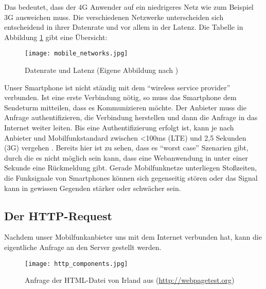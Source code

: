 			Das bedeutet, dass der 4G Anwender auf ein niedrigeres Netz wie zum Beispiel 3G ausweichen muss. Die verschiedenen Netzwerke unterscheiden sich entscheidend in ihrer Datenrate und vor allem in der Latenz. Die Tabelle in Abbildung \ref{fig:mobile_networks} gibt eine Übersicht:

			\begin{figure}[htbp]
				\begin{center}
					\texttt{[image: mobile\_networks.jpg]}
					\caption{Datenrate und Latenz (Eigene Abbildung nach \autocite{grigorikGNetwork})}
					\label{fig:mobile_networks}
				\end{center}
			\end{figure}

			Unser Smartphone ist nicht ständig mit dem "`wireless service provider"' verbunden. Ist eine erste Verbindung nötig, so muss das Smartphone dem Sendeturm mitteilen, dass es Kommunizieren möchte. Der Anbieter muss die Anfrage authentifizieren, die Verbindung herstellen und dann die Anfrage in das Internet weiter leiten. Bis eine Authentifizierung erfolgt ist, kann je nach Anbieter und Mobilfunkstandard zwischen <100ms (LTE) und 2,5 Sekunden (3G) vergehen \autocite{grigorikRadio}. Bereits hier ist zu sehen, dass es "`worst case"' Szenarien gibt, durch die es nicht möglich sein kann, dass eine Webanwendung in unter einer Sekunde eine Rückmeldung gibt. Gerade Mobilfunknetze unterliegen Stoßzeiten, die Funksignale von Smartphones können sich gegenseitig stören oder das Signal kann in gewissen Gegenden stärker oder schwächer sein.



		\subsection{Der HTTP-Request} %
		\label{sub:der_http_request_komponente}
			Nachdem unser Mobilfunkanbieter uns mit dem Internet verbunden hat, kann die eigentliche Anfrage an den Server gestellt werden.

			\begin{figure}[htbp]
				\begin{center}
					\texttt{[image: http\_components.jpg]}
					\caption{Anfrage der HTML-Datei von Irland aus (\url{http://webpagetest.org})}
					\label{fig:http_components}
				\end{center}
			\end{figure}

